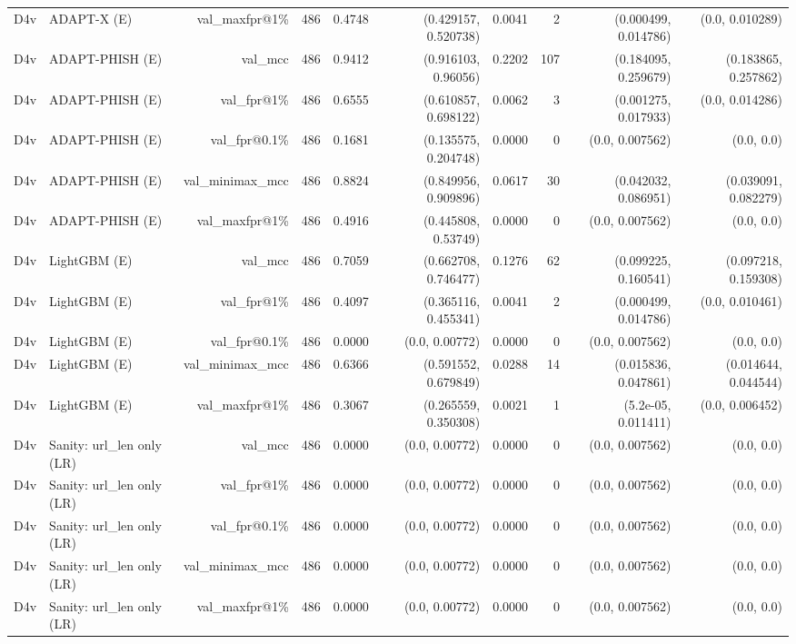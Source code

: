 \begin{table}[t]
\begin{tabular}{llrrrrrrrr}
D4v & ADAPT-X (E) & val\_maxfpr@1\% & 486 & 0.4748 & (0.429157, 0.520738) & 0.0041 & 2 & (0.000499, 0.014786) & (0.0, 0.010289) \\
D4v & ADAPT-PHISH (E) & val\_mcc & 486 & 0.9412 & (0.916103, 0.96056) & 0.2202 & 107 & (0.184095, 0.259679) & (0.183865, 0.257862) \\
D4v & ADAPT-PHISH (E) & val\_fpr@1\% & 486 & 0.6555 & (0.610857, 0.698122) & 0.0062 & 3 & (0.001275, 0.017933) & (0.0, 0.014286) \\
D4v & ADAPT-PHISH (E) & val\_fpr@0.1\% & 486 & 0.1681 & (0.135575, 0.204748) & 0.0000 & 0 & (0.0, 0.007562) & (0.0, 0.0) \\
D4v & ADAPT-PHISH (E) & val\_minimax\_mcc & 486 & 0.8824 & (0.849956, 0.909896) & 0.0617 & 30 & (0.042032, 0.086951) & (0.039091, 0.082279) \\
D4v & ADAPT-PHISH (E) & val\_maxfpr@1\% & 486 & 0.4916 & (0.445808, 0.53749) & 0.0000 & 0 & (0.0, 0.007562) & (0.0, 0.0) \\
D4v & LightGBM (E) & val\_mcc & 486 & 0.7059 & (0.662708, 0.746477) & 0.1276 & 62 & (0.099225, 0.160541) & (0.097218, 0.159308) \\
D4v & LightGBM (E) & val\_fpr@1\% & 486 & 0.4097 & (0.365116, 0.455341) & 0.0041 & 2 & (0.000499, 0.014786) & (0.0, 0.010461) \\
D4v & LightGBM (E) & val\_fpr@0.1\% & 486 & 0.0000 & (0.0, 0.00772) & 0.0000 & 0 & (0.0, 0.007562) & (0.0, 0.0) \\
D4v & LightGBM (E) & val\_minimax\_mcc & 486 & 0.6366 & (0.591552, 0.679849) & 0.0288 & 14 & (0.015836, 0.047861) & (0.014644, 0.044544) \\
D4v & LightGBM (E) & val\_maxfpr@1\% & 486 & 0.3067 & (0.265559, 0.350308) & 0.0021 & 1 & (5.2e-05, 0.011411) & (0.0, 0.006452) \\
D4v & Sanity: url\_len only (LR) & val\_mcc & 486 & 0.0000 & (0.0, 0.00772) & 0.0000 & 0 & (0.0, 0.007562) & (0.0, 0.0) \\
D4v & Sanity: url\_len only (LR) & val\_fpr@1\% & 486 & 0.0000 & (0.0, 0.00772) & 0.0000 & 0 & (0.0, 0.007562) & (0.0, 0.0) \\
D4v & Sanity: url\_len only (LR) & val\_fpr@0.1\% & 486 & 0.0000 & (0.0, 0.00772) & 0.0000 & 0 & (0.0, 0.007562) & (0.0, 0.0) \\
D4v & Sanity: url\_len only (LR) & val\_minimax\_mcc & 486 & 0.0000 & (0.0, 0.00772) & 0.0000 & 0 & (0.0, 0.007562) & (0.0, 0.0) \\
D4v & Sanity: url\_len only (LR) & val\_maxfpr@1\% & 486 & 0.0000 & (0.0, 0.00772) & 0.0000 & 0 & (0.0, 0.007562) & (0.0, 0.0) \\

\end{tabular}
\end{table}
